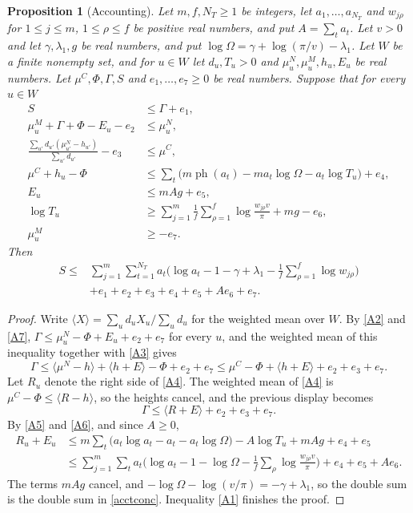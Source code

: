 \documentclass[11pt,letterpaper]{article}
\newtheorem{proposition}[theorem]{Proposition}
\numberwithin{equation}{section}
\begin{document}
\begin{proposition}[Accounting]\label{acct}
Let $m,f,N_T\ge1$ be integers, let $a_1,\dots,a_{N_T}$ and $w_{j\rho}$ for $1\le j\le m$, $1\le\rho\le f$ be positive real numbers, and put $A=\sum_ta_t$. Let $v>0$ and let $\gamma,\lambda_1,g$ be real numbers, and put $\log\Omega=\gamma+\log(\pi/v)-\lambda_1$. Let $W$ be a finite nonempty set, and for $u\in W$ let $d_u,T_u>0$ and $\mu^N_u,\mu^M_u,h_u,E_u$ be real numbers. Let $\mu^C,\Phi,\Gamma,S$ and $e_1,\dots,e_7\ge0$ be real numbers. Suppose that for every $u\in W$
\begin{align}
S&\le\Gamma+e_1,\label{A1}\\
\mu^M_u+\Gamma+\Phi-E_u-e_2&\le\mu^N_u,\label{A2}\\
\frac{\sum_{u'}d_{u'}(\mu^N_{u'}-h_{u'})}{\sum_{u'}d_{u'}}-e_3&\le\mu^C,\label{A3}\\
\mu^C+h_u-\Phi&\le\sum_{t}\big(m\operatorname{ph}(a_t)-ma_t\log\Omega-a_t\log T_u\big)+e_4,\label{A4}\\
E_u&\le mAg+e_5,\label{A5}\\
\log T_u&\ge\sum_{j=1}^m\frac1f\sum_{\rho=1}^f\log\frac{w_{j\rho}v}{\pi}+mg-e_6,\label{A6}\\
\mu^M_u&\ge-e_7.\label{A7}
\end{align}
Then
\begin{equation}\label{acctconc}
\begin{aligned}
S\le{}&\sum_{j=1}^m\sum_{t=1}^{N_T}a_t\Big(\log a_t-1-\gamma+\lambda_1-\frac1f\sum_{\rho=1}^f\log w_{j\rho}\Big)\\
&+e_1+e_2+e_3+e_4+e_5+Ae_6+e_7 .
\end{aligned}
\end{equation}
\end{proposition}
\begin{proof}
Write $\langle X\rangle=\sum_ud_uX_u/\sum_ud_u$ for the weighted mean over $W$. By \eqref{A2} and \eqref{A7}, $\Gamma\le\mu^N_u-\Phi+E_u+e_2+e_7$ for every $u$, and the weighted mean of this inequality together with \eqref{A3} gives
\[
\Gamma\le\langle\mu^N-h\rangle+\langle h+E\rangle-\Phi+e_2+e_7\le\mu^C-\Phi+\langle h+E\rangle+e_2+e_3+e_7 .
\]
Let $R_u$ denote the right side of \eqref{A4}. The weighted mean of \eqref{A4} is $\mu^C-\Phi\le\langle R-h\rangle$, so the heights cancel, and the previous display becomes
\[
\Gamma\le\langle R+E\rangle+e_2+e_3+e_7 .
\]
By \eqref{A5} and \eqref{A6}, and since $A\ge0$,
\begin{align*}
R_u+E_u&\le m\sum_t\big(a_t\log a_t-a_t-a_t\log\Omega\big)-A\log T_u+mAg+e_4+e_5\\
&\le\sum_{j=1}^m\sum_ta_t\Big(\log a_t-1-\log\Omega-\frac1f\sum_\rho\log\frac{w_{j\rho}v}{\pi}\Big)+e_4+e_5+Ae_6 .
\end{align*}
The terms $mAg$ cancel, and $-\log\Omega-\log(v/\pi)=-\gamma+\lambda_1$, so the double sum is the double sum in \eqref{acctconc}. Inequality \eqref{A1} finishes the proof.
\end{proof}
\end{document}
